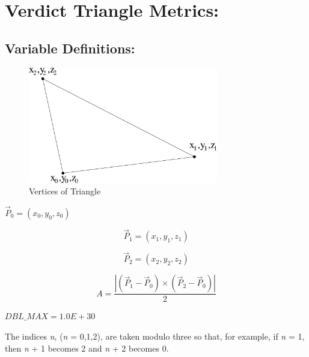 \documentclass[12pt]{article}
\begin{document}
\section*{Verdict Triangle Metrics:}

\subsection*{Variable Definitions:}

\begin{figure}[htb]
  \begin{center}
    \includegraphics[height=2.0in]{tri.eps}
    \caption{Vertices of Triangle}
    \label{fig:blank}
  \end{center}
\end{figure}

\begin{center}
$\vec P_0 = (x_0, y_0, z_0) $
\end{center}

\begin{displaymath}
\vec P_1 = (x_1, y_1, z_1) 
\end{displaymath}

\begin{displaymath}
\vec P_2 = (x_2, y_2, z_2) 
\end{displaymath}


\begin{displaymath}
A = \frac {| ( \vec P_1 - \vec P_0 ) \times ( \vec P_2 - \vec P_0 ) |}  
          {2} 
\end{displaymath}

\begin{center}
$DBL\_MAX = 1.0E+30 $
\end{center}

\begin{flushleft}
The indices \emph n, (\emph n = 0,1,2), are taken modulo three so that, for example, 
if \emph n = 1, then \emph n + 1 becomes 2 and \emph n + 2 becomes 0.
\end{flushleft}
\end{document}
